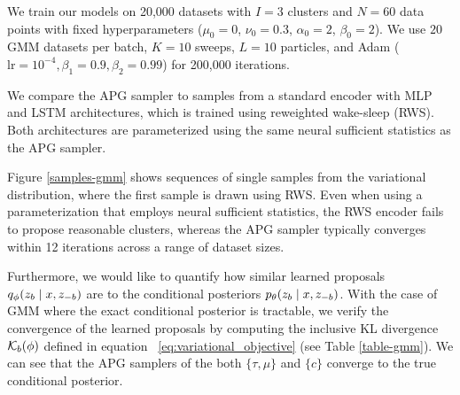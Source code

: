 \documentclass{article}
\theoremstyle{definition}
\begin{document}
We train our models on 20,000 datasets with $I = 3$ clusters and $N = 60$ data points with fixed hyperparameters ($\mu_0 = 0$, $\nu_0 = 0.3$, $\alpha_0 = 2$, $\beta_0 = 2$). We use $20$ GMM datasets per batch, $K=10$ sweeps, $L=10$ particles, and Adam ($\mathrm{lr} = 10^{-4}, \beta_1 = 0.9, \beta_2 = 0.99$) for 200,000 iterations.

We compare the APG sampler to samples from a standard encoder with MLP and LSTM architectures,  which is trained using reweighted wake-sleep (RWS). Both architectures are parameterized using the same neural sufficient statistics as the APG sampler.

Figure \ref{samples-gmm} shows sequences of single samples from the variational distribution, where the first sample is drawn using RWS. Even when using a parameterization that employs neural sufficient statistics, the RWS encoder fails to propose reasonable clusters, whereas the APG sampler typically converges within 12 iterations across a range of dataset sizes.

Furthermore, we would like to quantify how similar learned proposals $q_\phi(z_b \mid x, z_{-b})$ are to the conditional posteriors $p_\theta(z_b \mid x, z_{-b})$. With the case of GMM where the exact conditional posterior is tractable, we verify the convergence of the learned proposals by computing the inclusive KL divergence $\mathcal{K}_b(\phi)$ defined in equation ~\ref{eq:variational_objective} (see Table \ref{table-gmm}). We can see that the APG samplers of the both $\{\tau, \mu\}$ and $\{c\}$ converge to the true conditional posterior.


\end{document}
